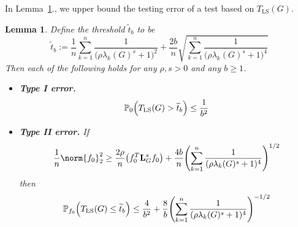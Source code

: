 \documentclass{article}
\newcommand{\1}{\mathbf{1}}
\newcommand{\Lap}{{\bf L}}
\newcommand{\Pbb}{\mathbb{P}}
\newcommand{\wt}[1]{\widetilde{#1}}
\newcommand{\LS}{\mathrm{LS}}
\theoremstyle{alden}
\theoremstyle{aldenthm}
\newtheorem{lemma}{Lemma}
\theoremstyle{definition}
\theoremstyle{remark}
\begin{document}
In Lemma~\ref{lem:ls_fixed_graph_testing}., we upper bound the testing error of a test based on $T_{\LS}(G)$.
\begin{lemma}
	\label{lem:ls_fixed_graph_testing}
	Define the threshold $\wt{t}_b$ to be
	\begin{equation*}
	\wt{t}_b := \frac{1}{n}\sum_{k = 1}^{n} \frac{1}{\bigl(\rho \lambda_k(G)^s + 1\bigr)^2} + \frac{2b}{n}\sqrt{\sum_{k = 1}^{n} \frac{1}{\bigl(\rho \lambda_k(G)^s + 1\bigr)^4}}
	\end{equation*}
	Then each of the following holds for any $\rho,s > 0$ and any $b \geq 1$.
	\begin{itemize}
		\item \textbf{Type I error.}
		\begin{equation}
		\label{eqn:ls_fixed_graph_testing_typeI}
		\Pbb_0\Bigl(T_{\LS}(G) > \wt{t}_b\Bigr) \leq \frac{1}{b^2}
		\end{equation}
		\item \textbf{Type II error.} If
		\begin{equation}
		\label{eqn:ls_fixed_graph_testing_critical_radius}
		\frac{1}{n}\norm{f_0}_2^2 \geq \frac{2 \rho}{n} \bigl(f_0^T \Lap_G^s f_0\bigr) + \frac{4b}{n} \Biggl(\sum_{k = 1}^{n} \frac{1}{(\rho\lambda_k(G)^s + 1)^4} \Biggr)^{1/2}
		\end{equation}
		then
		\begin{equation}
		\label{eqn:ls_fixed_graph_testing_typeII}
		\Pbb_{f_0}\Bigl(T_{\LS}(G) \leq \wt{t}_b\Bigr) \leq \frac{4}{b^2} + \frac{8}{b} \Biggl(\sum_{k = 1}^{n} \frac{1}{(\rho\lambda_k(G)^s + 1)^4} \Biggr)^{-1/2}
		\end{equation}
	\end{itemize}
\end{lemma}
\end{document}
